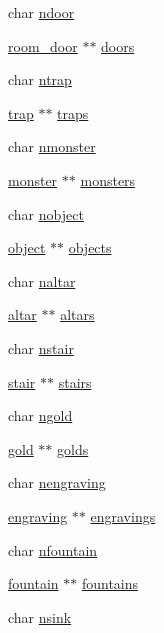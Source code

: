 \begin{DoxyCompactItemize}
\item 
char \hyperlink{struct__room_adf93ac64ee6c689fc8faf034101104d2}{ndoor}
\item 
\hyperlink{structroom__door}{room\+\_\+door} $\ast$$\ast$ \hyperlink{struct__room_a7680e15d05c73add8201e0b05ac24433}{doors}
\item 
char \hyperlink{struct__room_a8deec962297d6604afe7141d852413cc}{ntrap}
\item 
\hyperlink{structtrap}{trap} $\ast$$\ast$ \hyperlink{struct__room_aead249557eb11c2d252993fc008c480c}{traps}
\item 
char \hyperlink{struct__room_af54a6a7c092d32717c95edf356a23f88}{nmonster}
\item 
\hyperlink{structmonster}{monster} $\ast$$\ast$ \hyperlink{struct__room_a3825f14ece25f8f21e8613d5b77df092}{monsters}
\item 
char \hyperlink{struct__room_aa955a62dbaafdf4638c3d2ce3d08c650}{nobject}
\item 
\hyperlink{structobject}{object} $\ast$$\ast$ \hyperlink{struct__room_a950a5ae5abd82208ba0ccaf95369c3ec}{objects}
\item 
char \hyperlink{struct__room_a6e5fedf04693d5601d2fe64a2402963f}{naltar}
\item 
\hyperlink{structaltar}{altar} $\ast$$\ast$ \hyperlink{struct__room_ae093807c3fc83a79dfb56ba31537fd37}{altars}
\item 
char \hyperlink{struct__room_a4c7178c7b2d6aae68c8bc575e65b4928}{nstair}
\item 
\hyperlink{structstair}{stair} $\ast$$\ast$ \hyperlink{struct__room_ae3b0130f66fce4fc798876a6da829e64}{stairs}
\item 
char \hyperlink{struct__room_af05297b65bbb8d9ac4234faf6cedef40}{ngold}
\item 
\hyperlink{structgold}{gold} $\ast$$\ast$ \hyperlink{struct__room_a098fb9c2d338496af31b6219a81eb3ab}{golds}
\item 
char \hyperlink{struct__room_a3490cb38c5c28a5b859ad715371f9a03}{nengraving}
\item 
\hyperlink{structengraving}{engraving} $\ast$$\ast$ \hyperlink{struct__room_a39e5c581b788be17eaf8f3669fb7059a}{engravings}
\item 
char \hyperlink{struct__room_a1dd82879b9d6ec47eee892f2b1f02f28}{nfountain}
\item 
\hyperlink{structfountain}{fountain} $\ast$$\ast$ \hyperlink{struct__room_a4e68727ef155a3b332565ddf632b4e59}{fountains}
\item 
char \hyperlink{struct__room_a49a3273df13628e3928da7ec7cd88d2c}{nsink}
$$
\end{DoxyCompactItemize}
